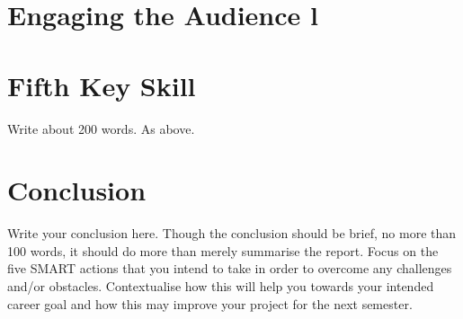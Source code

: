 \documentclass{scrartcl}
\begin{document}
\section{Engaging the Audience l}



\section{Fifth Key Skill}

Write about 200 words. As above.

\section{Conclusion}

Write your conclusion here. Though the conclusion should be brief, no more than 100 words, it should do more than merely summarise the report. Focus on the five SMART actions that you intend to take in order to overcome any challenges and/or obstacles. Contextualise how this will help you towards your intended career goal and how this may improve your project for the next semester.



\end{document}
